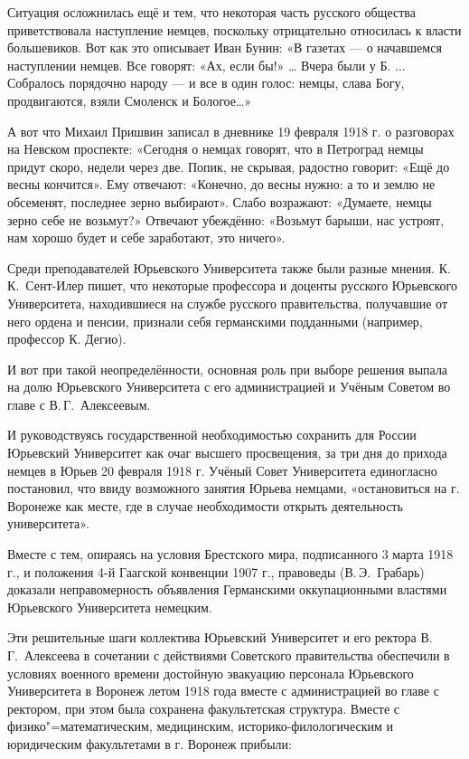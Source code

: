 Ситуация осложнилась ещё и тем, что некоторая часть русского общества приветствовала наступление немцев,
поскольку отрицательно относилась к власти большевиков.
Вот как это описывает Иван Бунин: «В газетах --- о начавшемся наступлении немцев. Все говорят: «Ах, если бы!» … Вчера были у Б. ... Собралось порядочно народу --- и все в один голос: немцы, слава Богу, продвигаются, взяли Смоленск и Бологое…»

А	вот что Михаил Пришвин записал в дневнике 19 февраля 1918 г. о разговорах на Невском проспекте: «Сегодня о немцах говорят, что в Петроград немцы придут скоро, недели через две. Попик, не скрывая, радостно говорит: «Ещё до весны кончится». Ему отвечают: «Конечно, до весны нужно: а то и землю не обсеменят, последнее зерно выбирают». Слабо возражают: «Думаете, немцы зерно себе не возьмут?» Отвечают убеждённо: «Возьмут барыши, нас устроят, нам хорошо будет и себе заработают, это ничего».

Среди преподавателей Юрьевского Университета также были разные мнения. К.\,К.~Сент-Илер пишет, что некоторые профессора и доценты русского Юрьевского Университета, находившиеся на службе русского правительства, получавшие от него ордена и пенсии, признали себя германскими подданными (например, профессор К. Дегио).

И вот при такой неопределённости, основная роль при выборе решения выпала на долю Юрьевского Университета с его администрацией и Учёным Советом во главе с В.\,Г.~Алексеевым.

И	руководствуясь государственной необходимостью сохранить для России Юрьевский Университет как очаг высшего просвещения, за три дня до прихода немцев в Юрьев 20 февраля 1918 г. Учёный Совет Университета единогласно постановил, что ввиду возможного занятия Юрьева немцами, «остановиться на г. Воронеже как месте, где в случае необходимости открыть деятельность университета».

Вместе с тем, опираясь на условия Брестского мира, подписанного 3 марта 1918 г., и положения 4-й Гаагской конвенции 1907 г., правоведы (В.\,Э.~Грабарь) доказали неправомерность объявления Германскими оккупационными властями Юрьевского Университета немецким.

Эти решительные шаги коллектива Юрьевский Университет и	его ректора В.\,Г.~Алексеева в сочетании с действиями Советского правительства обеспечили в условиях военного времени достойную эвакуацию персонала Юрьевского Университета в Воронеж летом 1918 года вместе с администрацией во главе с ректором, при этом была сохранена факультетская структура.
Вместе с физико"=математическим, медицинским, историко-филологическим и юридическим факультетами в г. Воронеж прибыли:

